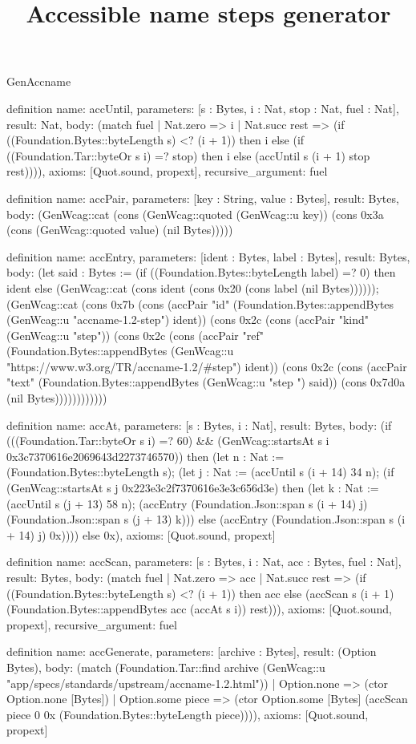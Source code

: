 \begin{lexlean}{GenAccname}
\title{Accessible name steps generator}
\begin{semanticmodule}
definition{
  name: accUntil,
  parameters: [s : Bytes, i : Nat, stop : Nat, fuel : Nat],
  result: Nat,
  body: (match fuel
    | Nat.zero => i
    | Nat.succ rest => (if ((Foundation.Bytes::byteLength s) <? (i + 1)) then i else (if ((Foundation.Tar::byteOr s i) =? stop) then i else (accUntil s (i + 1) stop rest)))),
  axioms: [Quot.sound, propext],
  recursive_argument: fuel
}

definition{
  name: accPair,
  parameters: [key : String, value : Bytes],
  result: Bytes,
  body: (GenWcag::cat (cons (GenWcag::quoted (GenWcag::u key)) (cons 0x3a (cons (GenWcag::quoted value) (nil Bytes)))))
}

definition{
  name: accEntry,
  parameters: [ident : Bytes, label : Bytes],
  result: Bytes,
  body: (let said : Bytes := (if ((Foundation.Bytes::byteLength label) =? 0) then ident else (GenWcag::cat (cons ident (cons 0x20 (cons label (nil Bytes)))))); (GenWcag::cat (cons 0x7b (cons (accPair "id" (Foundation.Bytes::appendBytes (GenWcag::u "accname-1.2-step") ident)) (cons 0x2c (cons (accPair "kind" (GenWcag::u "step")) (cons 0x2c (cons (accPair "ref" (Foundation.Bytes::appendBytes (GenWcag::u "https://www.w3.org/TR/accname-1.2/#step") ident)) (cons 0x2c (cons (accPair "text" (Foundation.Bytes::appendBytes (GenWcag::u "step ") said)) (cons 0x7d0a (nil Bytes))))))))))))
}

definition{
  name: accAt,
  parameters: [s : Bytes, i : Nat],
  result: Bytes,
  body: (if (((Foundation.Tar::byteOr s i) =? 60) && (GenWcag::startsAt s i 0x3c7370616e2069643d2273746570)) then (let n : Nat := (Foundation.Bytes::byteLength s); (let j : Nat := (accUntil s (i + 14) 34 n); (if (GenWcag::startsAt s j 0x223e3c2f7370616e3e3c656d3e) then (let k : Nat := (accUntil s (j + 13) 58 n); (accEntry (Foundation.Json::span s (i + 14) j) (Foundation.Json::span s (j + 13) k))) else (accEntry (Foundation.Json::span s (i + 14) j) 0x)))) else 0x),
  axioms: [Quot.sound, propext]
}

definition{
  name: accScan,
  parameters: [s : Bytes, i : Nat, acc : Bytes, fuel : Nat],
  result: Bytes,
  body: (match fuel
    | Nat.zero => acc
    | Nat.succ rest => (if ((Foundation.Bytes::byteLength s) <? (i + 1)) then acc else (accScan s (i + 1) (Foundation.Bytes::appendBytes acc (accAt s i)) rest))),
  axioms: [Quot.sound, propext],
  recursive_argument: fuel
}

definition{
  name: accGenerate,
  parameters: [archive : Bytes],
  result: (Option Bytes),
  body: (match (Foundation.Tar::find archive (GenWcag::u "app/specs/standards/upstream/accname-1.2.html"))
    | Option.none => (ctor Option.none [Bytes])
    | Option.some piece => (ctor Option.some [Bytes] (accScan piece 0 0x (Foundation.Bytes::byteLength piece)))),
  axioms: [Quot.sound, propext]
}
\end{semanticmodule}
\end{lexlean}
